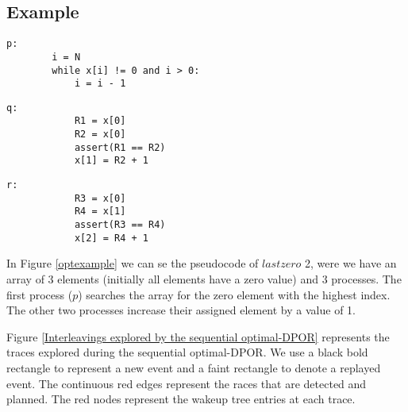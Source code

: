 \subsection{Example}

\begin{figure*}
    \begin{minipage}{0.3\textwidth}
      \begin{lstlisting}[frame=none, numbers=none]
        p:
        i = N
        while x[i] != 0 and i > 0:
            i = i - 1
      \end{lstlisting}
    \end{minipage}
    \begin{minipage}{0.3\textwidth}
        \begin{lstlisting}[frame=none, numbers=none]
            q:
            R1 = x[0]
            R2 = x[0]
            assert(R1 == R2)
            x[1] = R2 + 1
        \end{lstlisting}
      \end{minipage}
      \begin{minipage}{0.3\textwidth}
        \begin{lstlisting}[frame=none, numbers=none]
            r:
            R3 = x[0]
            R4 = x[1]
            assert(R3 == R4)
            x[2] = R4 + 1
        \end{lstlisting}
      \end{minipage}
      \caption{$Lastzero$ 2 example}
      \label{optexample}
  \end{figure*}

In Figure \ref{optexample} we can se the pseudocode of $lastzero$ 2, were we have an array of 3 elements (initially all elements have
a zero value) and 3 processes. The first process ($p$) searches the array for the zero element with the highest index. 
The other two processes increase their assigned element by a value of 1.


Figure \ref{Interleavings explored by the sequential optimal-DPOR} represents 
the traces explored during the sequential optimal-DPOR.
We use a black bold rectangle to represent a new event and a faint rectangle to denote a replayed event. 
The continuous red edges represent the races that are detected and planned. The red nodes represent the wakeup tree entries
at each trace.


